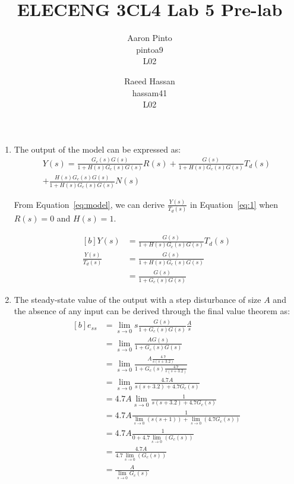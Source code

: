 \documentclass[12pt]{article}
\title{ELECENG 3CL4 Lab 5 Pre-lab}
\author{
    Aaron Pinto \\
    pintoa9 \\
    L02
    \and
    Raeed Hassan \\
    hassam41 \\
    L02
}
\begin{document}
\maketitle
\clearpage

\begin{enumerate}
	\item %
	The output of the model can be expressed as:
	\begin{multline} \label{eq:model}
        Y(s) = \frac{G_c(s)G(s)}{1+H(s)G_c(s)G(s)}R(s) + \frac{G(s)}{1+H(s)G_c(s)G(s)}T_d(s) \\ + \frac{H(s)G_c(s)G(s)}{1+H(s)G_c(s)G(s)}N(s)
    \end{multline}
	
	From Equation~\ref{eq:model}, we can derive $\frac{Y(s)}{T_d(s)}$ in Equation~\ref{eq:1} when $R(s) = 0$ and $H(s) = 1$.

	\begin{equation} \label{eq:1}
	\begin{aligned}[b]
		Y(s) &= \frac{G(s)}{1+H(s)G_c(s)G(s)}T_d(s) \\
		\frac{Y(s)}{T_d(s)} &= \frac{G(s)}{1+H(s)G_c(s)G(s)} \\
		&= \frac{G(s)}{1+G_c(s)G(s)}
	\end{aligned}
	\end{equation}

	\item %
	The steady-state value of the output with a step disturbance of size $A$ and the absence of any input can be derived through the final value theorem as:
	\begin{equation} \label{eq:2}
	\begin{aligned}[b]
		e_{ss} &= \lim_{s \to 0} s \frac{G(s)}{1+G_c(s)G(s)} \frac{A}{s} \\
		&= \lim_{s \to 0} \frac{AG(s)}{1+G_c(s)G(s)} \\
		&= \lim_{s \to 0} \frac{A \frac{4.7}{s(s+3.2)}}{1 + G_c(s) \frac{4.7}{s(s+3.2)}} \\
		&= \lim_{s \to 0} \frac{4.7 A}{s(s+3.2) + 4.7 G_c(s)} \\
		&= 4.7 A \lim_{s \to 0} \frac{1}{s(s+3.2) + 4.7 G_c(s)} \\
		&= 4.7 A \frac{1}{\lim_{s \to 0}\left( s(s+1) \right) + \lim_{s \to 0}(4.7G_c(s))} \\
		&= 4.7 A \frac{1}{0 + 4.7 \lim_{s \to 0}\left(G_c(s)\right)} \\
		&= \frac{4.7 A}{4.7 \lim_{s \to 0}\left(G_c(s)\right)} \\
		&= \frac{A}{\lim_{s \to 0}G_c(s)}
	\end{aligned}
	\end{equation}
	

\end{enumerate}
\end{document}
